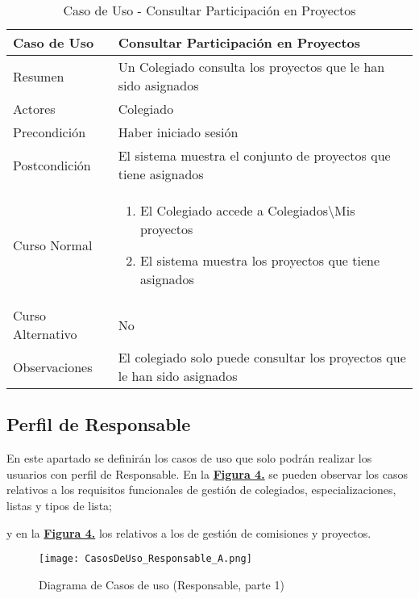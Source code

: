 \begin{table}[!htbp]
  \centering  \addtocounter{casouso}{1}
  \begin{tabular}{|l | p{100mm}|}
    \textbf{Caso de Uso}  & \textbf{Consultar Participación en Proyectos} \\ \hline
    Resumen 		 & Un Colegiado consulta los proyectos que le han sido asignados \\ \hline
    Actores  		 & Colegiado \\ \hline
    Precondición  	 & Haber iniciado sesión \\ \hline
    Postcondición  	 & El sistema muestra el conjunto de proyectos que tiene asignados \\ \hline
    Curso Normal   	 & \begin{enumerate}
	  \item El Colegiado accede a Colegiados\textbackslash Mis proyectos
	  \item El sistema muestra los proyectos que tiene asignados
    \end{enumerate}  \\ \hline
    Curso Alternativo  & No  \\ \hline
    Observaciones 	 & El colegiado solo puede consultar los proyectos que le han sido asignados \\ \hline
  \end{tabular}
  \caption{Caso de Uso  - Consultar Participación en Proyectos}
  \label{tab:cucConsultaProyectos}
\end{table}
\FloatBarrier


\subsection{Perfil de Responsable}

\addtocounter{figura_cap4}{1}
En este apartado se definirán los casos de uso que solo podrán realizar los usuarios con perfil de Responsable. En la \textbf{\hyperref[fig:CasosDeUso_Responsable_A]{Figura 4.}} se pueden observar los casos relativos a los requisitos funcionales de gestión de colegiados, especializaciones, listas y tipos de lista;\addtocounter{figura_cap4}{1} y en la \textbf{\hyperref[fig:CasosDeUso_Responsable_B]{Figura 4.}} los relativos a los de gestión de comisiones y proyectos.

\begin{figure}[!htbp]
  \centering
  \texttt{[image: CasosDeUso\_Responsable\_A.png]}
  \caption{Diagrama de Casos de uso (Responsable, parte 1)}
  \label{fig:CasosDeUso_Responsable_A}
\end{figure}
\FloatBarrier

